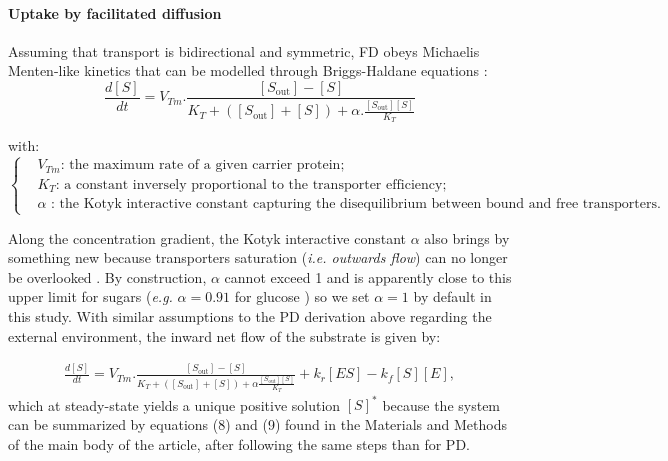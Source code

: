\noindent\paragraph{Uptake by facilitated diffusion}

Assuming that transport is bidirectional and symmetric, FD obeys Michaelis Menten-like kinetics \citep{Kotyk67} that can be modelled through Briggs-Haldane equations \citep{Briggs25}:
\begin{equation}
\frac{d[S]}{dt}=V_{Tm}.\frac{[S_\text{out}]-[S]}{K_T+([S_\text{out}]+[S])+\alpha.\frac{[S_\text{out}][S]}{K_T}}
\end{equation}

with:
\small
\begin{equation*}
  \left\{
      \begin{aligned}
		&V_{Tm}\text{: the maximum rate of a given carrier protein;}\\
		&K_T\text{: a constant inversely proportional to the transpor}
		\text{ter efficiency};\\
		&\alpha \text{ : the Kotyk interactive constant  capturing the dis}
		\text{equilibrium between bound and free transporters.}
      \end{aligned}
    \right.
\end{equation*}
\normalsize

Along the concentration gradient, the Kotyk interactive constant 
$\alpha$ \cite{Kotyk67} also brings by something new because transporters saturation (\textit{i.e. outwards flow}) can no longer be overlooked \citep{Teusink98,Bosdriesz18}. By construction, $\alpha$ cannot exceed 1 and is apparently close to this upper limit for sugars (\textit{e.g.} $\alpha=0.91$ for glucose \citet{Kotyk67}) so we set $\alpha=1$ by default in this study. With similar assumptions to the PD derivation above regarding the external environment, the inward net flow of the substrate is given by:

\begin{align*}
\frac{d[S]}{dt}=V_{Tm}.\frac{[S_\text{out}]-[S]}{K_T+([S_\text{out}]+[S])+\alpha\frac{[S_\text{out}][S]}{K_T}}+k_{r}[ES]-k_f[S][E],
\label{MMT_equa_FD}
\end{align*}
which at steady-state yields a unique positive solution $[S]^*$ because the system can be summarized by equations (8) and (9) found in the Materials and Methods of the main body of the article, after following the same steps than for PD.

